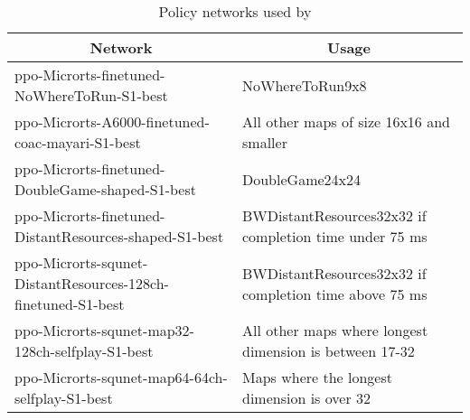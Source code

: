 \documentclass{article}
\begin{document}
\begin{table}[H]
\end{table}

\begin{table}[h]
    \caption{Policy networks used by \agentName}
    \label{tab:policy-networks}
    \begin{center}
        \begin{tabular}{|p{0.5\linewidth}|p{0.5\linewidth}|}
            \multicolumn{1}{c}{\bf Network}  &\multicolumn{1}{c}{\bf Usage} \\
            \hline
            ppo-Microrts-finetuned-NoWhereToRun-S1-best & NoWhereToRun9x8 \\ \hline
            ppo-Microrts-A6000-finetuned-coac-mayari-S1-best & All other maps of size 16x16 and smaller \\ \hline
            ppo-Microrts-finetuned-DoubleGame-shaped-S1-best & DoubleGame24x24 \\ \hline
            ppo-Microrts-finetuned-DistantResources-shaped-S1-best & BWDistantResources32x32 if completion time under 75 ms \\ \hline
            ppo-Microrts-squnet-DistantResources-128ch-finetuned-S1-best & BWDistantResources32x32 if completion time above 75 ms \\ \hline
            ppo-Microrts-squnet-map32-128ch-selfplay-S1-best & All other maps where longest dimension is between 17-32 \\ \hline
            ppo-Microrts-squnet-map64-64ch-selfplay-S1-best & Maps where the longest
            dimension is over 32 \\
            \hline
        \end{tabular}
    \end{center}
\end{table}
\end{document}

